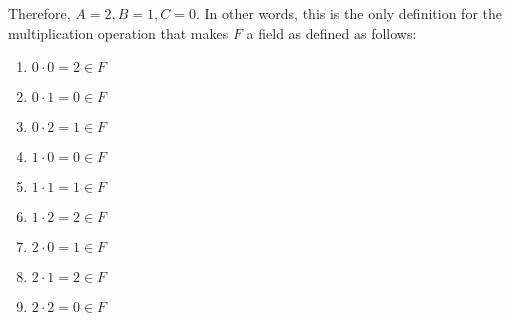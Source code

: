 \documentclass[12pt, letterpaper, oneside]{book}
\begin{document}
Therefore, $A = 2, B = 1, C = 0$. In other words, this is the only definition for the multiplication operation that
makes $F$ a field as defined as follows:
\begin{enumerate}
  \item $0 \cdot 0 = 2 \in F$
  \item $0 \cdot 1 = 0 \in F$
  \item $0 \cdot 2 = 1 \in F$
  \item $1 \cdot 0 = 0 \in F$
  \item $1 \cdot 1 = 1 \in F$
  \item $1 \cdot 2 = 2 \in F$
  \item $2 \cdot 0 = 1 \in F$
  \item $2 \cdot 1 = 2 \in F$
  \item $2 \cdot 2 = 0 \in F$
\end{enumerate}
\end{document}
